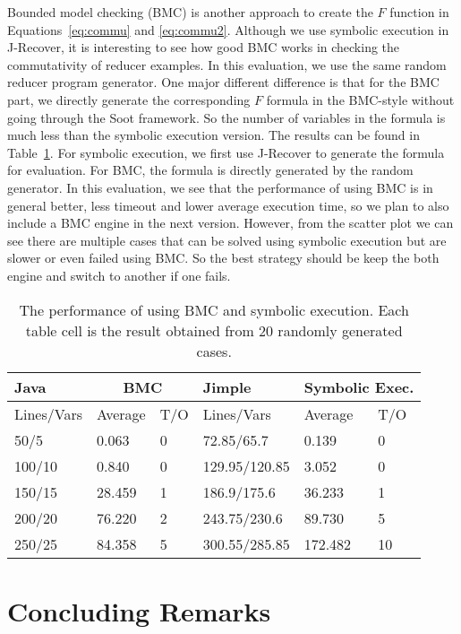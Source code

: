 \documentclass{llncs}
\begin{document}
Bounded model checking (BMC) is another approach to create the $F$ function in Equations~\ref{eq:commu} and \ref{eq:commu2}. Although we use symbolic execution in J-Recover, it is interesting to see how good BMC works in checking the commutativity of reducer examples. In this evaluation, we use the same random reducer program generator. One major different difference is that for the BMC part, we directly generate the corresponding $F$ formula in the BMC-style without going through the Soot framework. So the number of variables in the formula is much less than the symbolic execution version. The results can be found in Table~\ref{tab:bmc}. For symbolic execution, we first use J-Recover to generate the formula for evaluation. For BMC, the formula is directly generated by the random generator. In this evaluation, we see that the performance of using BMC is in general better, less timeout and lower average execution time, so we plan to also include a BMC engine in the next version. However, from the scatter plot we can see there are multiple cases that  can be solved using symbolic execution but are slower or even failed using BMC. So the best strategy should be keep the both engine and switch to another if one fails.




\begin{table}[htb]

\begin{minipage}{0.7\textwidth}	
	\begin{tabular}{|l||l|l| l||l|l|}
\hline
		Java& \multicolumn{2}{c|}{\small BMC}	& Jimple& \multicolumn{2}{c|}{\small Symbolic Exec.} \\
\hline
		\small Lines/Vars & \small Average & \small  \small T/O & Lines/Vars& \small Average & \small  \small T/O \\
\hline
\hline
		50/5	&	0.063		&	0	&	72.85/65.7	&	0.139	&		0	\\
\hline
		100/10	&	0.840	&		0	&	129.95/120.85	&	3.052	&	0	\\
\hline
		150/15	&	28.459	&		1	&	186.9/175.6	&	36.233	&		1	\\
\hline
		200/20	&	76.220	&		2	&	243.75/230.6	&	89.730	&		5	\\
\hline
		250/25	&	84.358	&		5	&	300.55/285.85	&	172.482	&		10	\\
\hline
	\end{tabular}
		\end{minipage}		
	\begin{minipage}{0.29\textwidth}
		\end{minipage}		
	\caption{The performance of using BMC and symbolic execution. Each table cell is the result obtained from 20 randomly generated cases.}
	\label{tab:bmc}
	
\end{table}

\section{Concluding Remarks}




\end{document}
